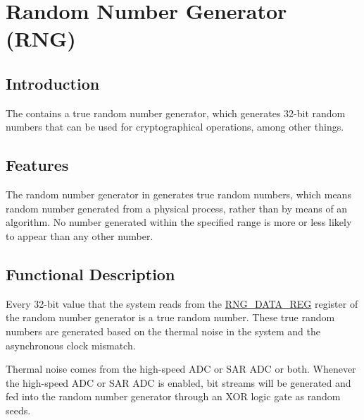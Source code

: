 \documentclass[main\_\_EN.tex]{subfiles}
\begin{document}

\ifglobal
\else
    {\let\clearpage\relax \listoftodos}
    \tableofcontents
\fi



\hypertarget{rng}{}
\chapter{Random Number Generator (RNG)}\label{mod:rng}

\section{Introduction}

The \chipname{} contains a true random number generator, which generates 32-bit random numbers that can be used for cryptographical operations, among other things.

\section{Features}

The random number generator in \chipname{} generates true random numbers, which means random number generated from a physical process, rather than by means of an algorithm. No number generated within the specified range is more or less likely to appear than any other number.

\section{Functional Description}\label{sec:rng-func-descr}

Every 32-bit value that the system reads from the \hyperref[regdesc:RNGDATAREG]{RNG\_DATA\_REG} register of the random number generator is a true random number. These true random numbers are generated based on the thermal noise in the system and the asynchronous clock mismatch.

Thermal noise comes from the high-speed ADC or SAR ADC or both. Whenever the high-speed ADC or SAR ADC is enabled, bit streams will be generated and fed into the random number generator through an XOR logic gate as random seeds.
\end{document}
